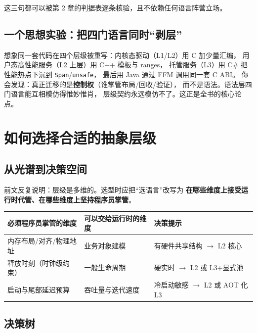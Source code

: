 \documentclass[12pt,a4paper,fontset=fandol]{ctexbook}
\begin{document}
这三句都可以被第 2 章的判据表逐条核验，且不依赖任何语言阵营立场。

\section{一个思想实验：把四门语言同时``剥层''}

想象同一套代码在四个层级被重写：内核态驱动（L1/L2）用 C 加少量汇编，
用户态高性能服务（L2 上层）用 C++ 模板与 ranges，
托管服务（L3）用 C\# 把性能热点下沉到 \texttt{Span}/\allowbreak{}\texttt{unsafe}，
最后用 Java 通过 FFM 调用同一套 C ABI。
你会发现：真正迁移的是\textbf{控制权}（谁掌管布局/回收/验证），
而不是语法。语法层四门语言能互相模仿得惟妙惟肖，
层级契约永远模仿不了。这正是全书的核心论点。

\chapter{如何选择合适的抽象层级}

\section{从光谱到决策空间}

前文反复说明：层级是多维的。选型时应把``选语言''改写为
\textbf{在哪些维度上接受运行时代管、在哪些维度上坚持程序员掌管}。

\begin{center}
\begin{tabular}{@{}p{}p{}p{}@{}}
\toprule
\textbf{必须程序员掌管的维度} & \textbf{可以交给运行时的维度} & \textbf{决策提示} \\
\midrule
内存布局/对齐/物理地址 & 业务对象建模 & 有硬件共享结构 $\to$ L2 核心 \\
释放时刻（时钟级约束） & 一般生命周期 & 硬实时 $\to$ L2 或 L3+显式池 \\
启动与尾部延迟预算 & 吞吐量与迭代速度 & 冷启动敏感 $\to$ L2 或 AOT 化 L3 \\
\bottomrule
\end{tabular}
\end{center}

\section{决策树}
\end{document}
